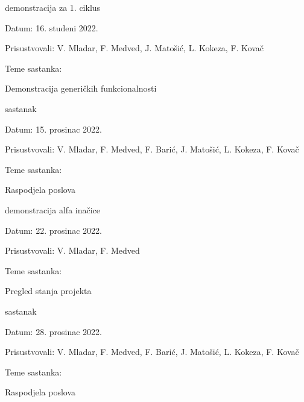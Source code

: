 \begin{packed_enum}
			\item  demonstracija za 1. ciklus
			\item[] \begin{packed_item}
				\item Datum: 16. studeni 2022.
				\item Prisustvovali: V. Mladar, F. Medved, J. Matošić, L. Kokeza, F. Kovač
				\item Teme sastanka:
				\begin{packed_item}
					\item  Demonstracija generičkih funkcionalnosti
				\end{packed_item}
			\end{packed_item}
			\bigskip

			\item  sastanak
			\item[] \begin{packed_item}
				\item Datum: 15. prosinac 2022.
				\item Prisustvovali: V. Mladar, F. Medved, F. Barić, J. Matošić, L. Kokeza, F. Kovač
				\item Teme sastanka:
				\begin{packed_item}
					\item  Raspodjela poslova
				\end{packed_item}
			\end{packed_item}
			\bigskip

			\item  demonstracija alfa inačice
			\item[] \begin{packed_item}
				\item Datum: 22. prosinac 2022.
				\item Prisustvovali: V. Mladar, F. Medved
				\item Teme sastanka:
				\begin{packed_item}
					\item  Pregled stanja projekta
				\end{packed_item}
			\end{packed_item}
			\bigskip

			\item  sastanak
			\item[] \begin{packed_item}
				\item Datum: 28. prosinac 2022.
				\item Prisustvovali: V. Mladar, F. Medved, F. Barić, J. Matošić, L. Kokeza, F. Kovač
				\item Teme sastanka:
				\begin{packed_item}
					\item  Raspodjela poslova
				\end{packed_item}
			\end{packed_item}
			\bigskip


\end{packed_enum}
